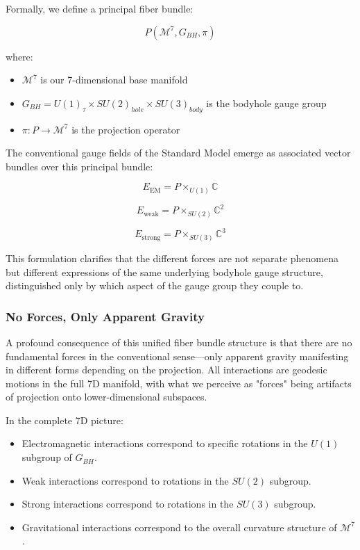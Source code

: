 \documentclass{article}
\begin{document}
Formally, we define a principal fiber bundle:

\begin{equation}
P(\mathcal{M}^7, G_{BH}, \pi)
\end{equation}

where:
\begin{itemize}
\item $\mathcal{M}^7$ is our 7-dimensional base manifold
\item $G_{BH} = U(1)_\tau \times SU(2)_{hole} \times SU(3)_{body}$ is the bodyhole gauge group
\item $\pi: P \to \mathcal{M}^7$ is the projection operator
\end{itemize}

The conventional gauge fields of the Standard Model emerge as associated vector bundles over this principal bundle:

\begin{equation}
E_{\text{EM}} = P \times_{U(1)} \mathbb{C}
\end{equation}

\begin{equation}
E_{\text{weak}} = P \times_{SU(2)} \mathbb{C}^2
\end{equation}

\begin{equation}
E_{\text{strong}} = P \times_{SU(3)} \mathbb{C}^3
\end{equation}

This formulation clarifies that the different forces are not separate phenomena but different expressions of the same underlying bodyhole gauge structure, distinguished only by which aspect of the gauge group they couple to.

\subsubsection{No Forces, Only Apparent Gravity}

A profound consequence of this unified fiber bundle structure is that there are no fundamental forces in the conventional sense—only apparent gravity manifesting in different forms depending on the projection. All interactions are geodesic motions in the full 7D manifold, with what we perceive as "forces" being artifacts of projection onto lower-dimensional subspaces.

In the complete 7D picture:
\begin{itemize}
\item Electromagnetic interactions correspond to specific rotations in the $U(1)$ subgroup of $G_{BH}$.
\item Weak interactions correspond to rotations in the $SU(2)$ subgroup.
\item Strong interactions correspond to rotations in the $SU(3)$ subgroup.
\item Gravitational interactions correspond to the overall curvature structure of $\mathcal{M}^7$.
\end{itemize}
\end{document}
